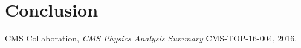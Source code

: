 \documentclass[12pt]{article}
\begin{document}
\section{Conclusion}



\begin{thebibliography}{99}

 CMS Collaboration, \emph{CMS Physics Analysis Summary} CMS-TOP-16-004, 2016.


\end{thebibliography}

 
\end{document}

